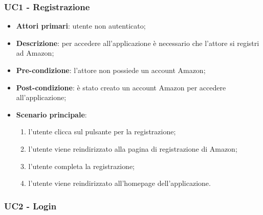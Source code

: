 \subsubsection{UC1 - Registrazione}

\begin{itemize}
\item \textbf{Attori primari}: utente non autenticato;

\item \textbf{Descrizione}: per accedere all'applicazione è necessario che l'attore si registri ad Amazon;

\item \textbf{Pre-condizione}: l'attore non possiede un account Amazon;

\item \textbf{Post-condizione}: è stato creato un account Amazon per accedere all'applicazione;

\item \textbf{Scenario principale}:
\begin{enumerate}
\item l'utente clicca sul pulsante per la registrazione;
\item l'utente viene reindirizzato alla pagina di registrazione di Amazon;
\item l'utente completa la registrazione;
\item l'utente viene reindirizzato all'homepage dell'applicazione.

\end{enumerate}

\end{itemize}

\subsubsection{UC2 - Login}

